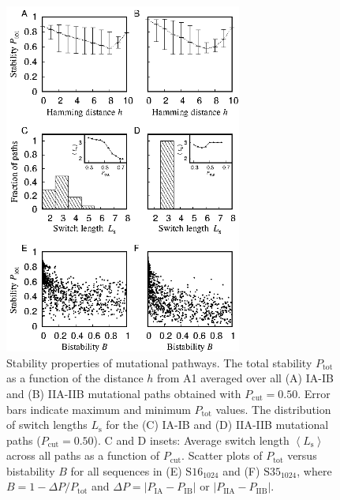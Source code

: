 \documentclass[
aip,
rsi,%
amsmath,amssymb,
reprint,%
]{revtex4-1}
\newcommand {\Pcut}     	{{P_\mathrm{cut}}}
\newcommand {\Ptot}	{{P_\mathrm{tot}}}
\newcommand {\PIA}    	{{P_\mathrm{IA}}}
\newcommand {\PIB}    	{{P_\mathrm{IB}}}
\newcommand {\PIIA}    	{{P_\mathrm{IIA}}}
\newcommand {\PIIB}    	{{P_\mathrm{IIB}}}
\newcommand {\SI}		{${\mathrm{S16}_{1024}}$}
\newcommand {\SII}		{${\mathrm{S35}_{1024}}$}
\begin{document}
\begin{figure}
\includegraphics[width=7.8cm]{Fig6}
\caption{Stability properties of mutational pathways. The total stability $\Ptot$ as a function of the distance $h$ from A1 averaged over all (A) IA-IB and (B) IIA-IIB mutational paths obtained with $\Pcut=0.50$. Error bars indicate maximum and minimum $\Ptot$ values. The distribution of switch lengths $L_\mathrm{s}$ for the (C) IA-IB and (D) IIA-IIB mutational paths ($\Pcut=0.50$). C and D insets: Average switch length $\left < L_\mathrm{s}\right >$ across all paths as a function of $\Pcut$. Scatter plots of $\Ptot$ versus bistability $B$ for all sequences in (E) {\SI} and (F) {\SII}, where $B=1-\Delta P/\Ptot$ and $\Delta P = |\PIA-\PIB|$ or $|\PIIA-\PIIB|$.}
\end{figure}

\end{document}

